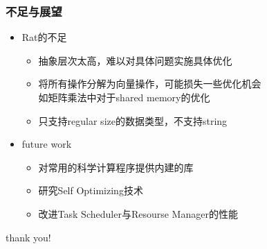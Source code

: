\documentclass{beamer}
\begin{document}
\begin{frame}
  \frametitle{不足与展望}
  \begin{itemize}
    \item Rat的不足
      \begin{itemize}
        \item 抽象层次太高，难以对具体问题实施具体优化
        \item 将所有操作分解为向量操作，可能损失一些优化机会\\
          如矩阵乘法中对于shared memory的优化
        \item 只支持regular size的数据类型，不支持string
      \end{itemize}
    \item future work
      \begin{itemize}
        \item 对常用的科学计算程序提供内建的库
        \item 研究Self Optimizing技术
        \item 改进Task Scheduler与Resourse Manager的性能
      \end{itemize}
  \end{itemize}
\end{frame}

\begin{frame}
  \Huge{thank you!}
\end{frame}
\end{document}
